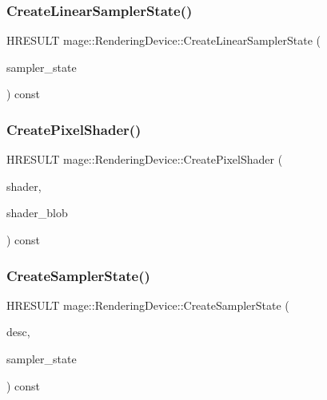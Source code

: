 \hypertarget{classmage_1_1_rendering_device_a366f60212c1f83348e9b2899e65c6602}{}\label{classmage_1_1_rendering_device_a366f60212c1f83348e9b2899e65c6602} 
\subsubsection{\texorpdfstring{Create\+Linear\+Sampler\+State()}{CreateLinearSamplerState()}}
{\footnotesize\ttfamily H\+R\+E\+S\+U\+LT mage\+::\+Rendering\+Device\+::\+Create\+Linear\+Sampler\+State (\begin{DoxyParamCaption}\item[{I\+D3\+D11\+Sampler\+State $\ast$$\ast$}]{sampler\+\_\+state }\end{DoxyParamCaption}) const}

\hypertarget{classmage_1_1_rendering_device_a68a23d85d973e4baffa31a0a91c55ca1}{}\label{classmage_1_1_rendering_device_a68a23d85d973e4baffa31a0a91c55ca1} 
\subsubsection{\texorpdfstring{Create\+Pixel\+Shader()}{CreatePixelShader()}}
{\footnotesize\ttfamily H\+R\+E\+S\+U\+LT mage\+::\+Rendering\+Device\+::\+Create\+Pixel\+Shader (\begin{DoxyParamCaption}\item[{I\+D3\+D11\+Pixel\+Shader $\ast$$\ast$}]{shader,  }\item[{\hyperlink{namespacemage_ae74f374780900893caa5555d1031fd79}{Com\+Ptr}$<$ I\+D3\+D\+Blob $>$}]{shader\+\_\+blob }\end{DoxyParamCaption}) const}

\hypertarget{classmage_1_1_rendering_device_a66270dc7a4c1663a11eda58df73c135d}{}\label{classmage_1_1_rendering_device_a66270dc7a4c1663a11eda58df73c135d} 
\subsubsection{\texorpdfstring{Create\+Sampler\+State()}{CreateSamplerState()}}
{\footnotesize\ttfamily H\+R\+E\+S\+U\+LT mage\+::\+Rendering\+Device\+::\+Create\+Sampler\+State (\begin{DoxyParamCaption}\item[{const D3\+D11\+\_\+\+S\+A\+M\+P\+L\+E\+R\+\_\+\+D\+E\+SC $\ast$}]{desc,  }\item[{I\+D3\+D11\+Sampler\+State $\ast$$\ast$}]{sampler\+\_\+state }\end{DoxyParamCaption}) const}

